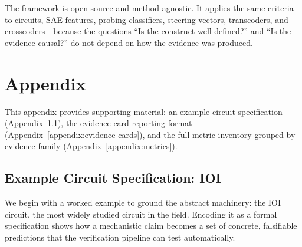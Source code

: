 \documentclass[10pt]{article}
\begin{document}
The framework is open-source and method-agnostic. It applies the same criteria to circuits, SAE features, probing classifiers, steering vectors, transcoders, and crosscoders---because the questions ``Is the construct well-defined?'' and ``Is the evidence causal?'' do not depend on how the evidence was produced.

%
%



\nocite{campbell1963experimental,loevinger1957objective}



\clearpage
\appendix
\section{Appendix}

This appendix provides supporting material: an example circuit specification
(Appendix~\ref{appendix:ioi-detail}), the evidence card reporting format
(Appendix~\ref{appendix:evidence-cards}), and the full metric inventory grouped by
evidence family (Appendix~\ref{appendix:metrics}).

\subsection{Example Circuit Specification: IOI}

\label{appendix:ioi-detail}

We begin with a worked example to ground the abstract machinery: the IOI circuit,
the most widely studied circuit in the field.
Encoding it as a formal specification  shows how a mechanistic claim becomes a set of concrete, falsifiable predictions that the verification pipeline can test automatically.
\end{document}
